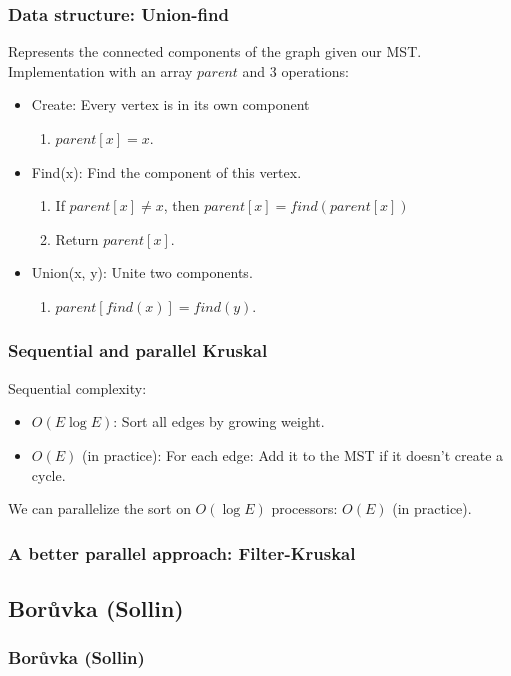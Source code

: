 \documentclass{beamer}
\begin{document}
\begin{frame}
    \frametitle{Data structure: Union-find}
    Represents the connected components of the graph given our MST.
    Implementation with an array $parent$ and 3 operations:
    \begin{itemize}
        \item Create: Every vertex is in its own component
            \begin{enumerate}
                \item $parent[x] = x$.
            \end{enumerate}
        \item<2-> Find(x): Find the component of this vertex.
            \begin{enumerate}
                \item If $parent[x] \neq x$, then $parent[x] = find(parent[x])$
                \item Return $parent[x]$.
            \end{enumerate}
        \item<3-> Union(x, y): Unite two components.
            \begin{enumerate}
                \item $parent[find(x)] = find(y)$.
            \end{enumerate}
    \end{itemize}

\end{frame}

\begin{frame}
    \frametitle{Sequential and parallel Kruskal}
    Sequential complexity:
    \begin{itemize}
        \item $O(E \log E)$: Sort all edges by growing weight.
        \item $O(E)$ (in practice): For each edge: Add it to the MST if it doesn't create a cycle.
    \end{itemize}

    We can parallelize the sort on $O(\log E)$ processors: $O(E)$ (in practice).

\end{frame}

\begin{frame}
    \frametitle{A better parallel approach: Filter-Kruskal}
\end{frame}

\subsection{Borůvka (Sollin)}
\begin{frame}
\frametitle{Borůvka (Sollin)}
\end{frame}
\end{document}
